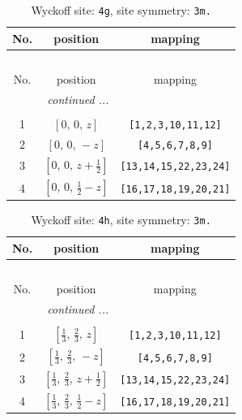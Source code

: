 \documentclass[fleqn,8pt]{jsarticle}
\begin{document}
\begin{longtable}{ccc}
\caption{Wyckoff site: {\tt 4g}, site symmetry: {\tt 3m.}}
 \\
 \hline \hline
No. & position & mapping \\ \hline \endfirsthead

\multicolumn{2}{l}{\tablename\ \thetable{}} \\
 \hline \hline
No. & position & mapping \\ \hline \endhead

 \hline \hline
\multicolumn{2}{r}{\footnotesize\it continued ...} \\ \endfoot

 \hline \hline
\multicolumn{2}{r}{} \\ \endlastfoot

1 & $\left[ 0,\, 0,\, z \right]$ & {\tt [1,2,3,10,11,12]} \\ \hline
2 & $\left[ 0,\, 0,\, - z \right]$ & {\tt [4,5,6,7,8,9]} \\ \hline
3 & $\left[ 0,\, 0,\, z + \frac{1}{2} \right]$ & {\tt [13,14,15,22,23,24]} \\ \hline
4 & $\left[ 0,\, 0,\, \frac{1}{2} - z \right]$ & {\tt [16,17,18,19,20,21]} \\
\end{longtable}
\renewcommand{\arraystretch}{1.2}
\begin{longtable}{ccc}
\caption{Wyckoff site: {\tt 4h}, site symmetry: {\tt 3m.}}
 \\
 \hline \hline
No. & position & mapping \\ \hline \endfirsthead

\multicolumn{2}{l}{\tablename\ \thetable{}} \\
 \hline \hline
No. & position & mapping \\ \hline \endhead

 \hline \hline
\multicolumn{2}{r}{\footnotesize\it continued ...} \\ \endfoot

 \hline \hline
\multicolumn{2}{r}{} \\ \endlastfoot

1 & $\left[ \frac{1}{3},\, \frac{2}{3},\, z \right]$ & {\tt [1,2,3,10,11,12]} \\ \hline
2 & $\left[ \frac{1}{3},\, \frac{2}{3},\, - z \right]$ & {\tt [4,5,6,7,8,9]} \\ \hline
3 & $\left[ \frac{1}{3},\, \frac{2}{3},\, z + \frac{1}{2} \right]$ & {\tt [13,14,15,22,23,24]} \\ \hline
4 & $\left[ \frac{1}{3},\, \frac{2}{3},\, \frac{1}{2} - z \right]$ & {\tt [16,17,18,19,20,21]} \\
\end{longtable}
\end{document}
